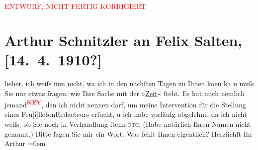 
\begin{center}
            \textcolor{red}{ENTWURF, NICHT FERTIG KORRIGIERT}
                      \end{center}
            
         
         \renewcommand{\erwaehntePersonen}{Personen: Hedwig Bleibtreu, Felix Salten}
         \renewcommand{\erwaehnteInstitutionen}{Institutionen: Die Zeit}
         \renewcommand{\erwaehnteOrte}{Orte: Sternwartestraße, Wien}
         \renewcommand{\erwaehnteWerke}{}
               \section[Arthur Schnitzler an Felix Salten, {[}14. 4. 1910?{]}]{ Arthur Schnitzler an Felix Salten, {[}14. 4. 1910?{]}}\nopagebreak{}\rehead{ }\begin{ledgroupsized}[t]{13cm}\normalsize\beginnumbering \toendnotes[C]{\smallbreak\pagebreak[2]} 
\toendnotes[C]{\smallbreak}\pstart
           \noindent{}{\pb}lieber, ich weiſs nun nicht, wa{\geminationn} ich in
               den nächſten Tagen zu Ihnen ko{\geminationm}en ka{\geminationn} u muſs Sie nur etwas fragen: wie Ihre Sache mit der
               »\uline{Zeit}« ſteht. Es hat mich nemlich {\pb}jemand\textcolor{red}{\textsuperscript{\textbf{KEY}}}, den ich nicht nennen darf, um
               meine Intervention für die Stellung eines Feu{[}i{]}lletonRedacteurs
               erſucht, u ich habe vorläufg abgelehnt, da ich nicht weiſs, ob Sie noch in
               Verhandlung {\pb}ſtehn \textsc{etc.} (Habe natürlich Ihren
               Namen nicht genannt.) Bitte ſagen Sie mir ein Wort. Was fehlt Ihnen eigentlich?
            \pend
           \pstart
           Herzlichſt Ihr {\\[\baselineskip]}\spacefill\mbox{Arthur}\pend
           \leftskip=0em{}\pstart
           \noindent{}\label{K_L03015-1v}
\end{ledgroupsized}
